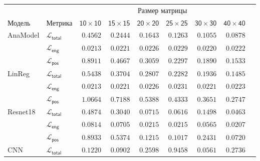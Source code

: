\documentclass[a4paper,12pt]{extarticle}
\begin{document}
\begin{table}[t]
	\footnotesize
	\centering
	\begin{tabular}{llrrrrrrr}
		\toprule
		{} & {} & \multicolumn{6}{c}{\textsf{Размер матрицы}} \\
		\cmidrule(lr){3-8}
		\textsf{Модель} & \textsf{Метрика} & $\mathsf{10 \times 10}$ &  $\mathsf{15 \times 15}$ &  $\mathsf{20 \times 20}$ &  $\mathsf{25 \times 25}$ &  $\mathsf{30 \times 30}$ &  $\mathsf{40 \times 40}$ \\
		\midrule
        \textsf{AnaModel} & $\mathcal{L}_{\mathsf{total}}$ & $\mathsf{0.4562}$ & $\mathsf{0.2444}$ & $\mathsf{0.1643}$ & $\mathsf{0.1263}$ & $\mathsf{0.1055}$ & $\mathsf{0.0878}$ \\
        {} & $\mathcal{L}_{\mathsf{eng}}$ & $\mathsf{0.0213}$ & $\mathsf{0.0221}$ & $\mathsf{0.0226}$ & $\mathsf{0.0229}$ & $\mathsf{0.0220}$ & $\mathsf{0.0222}$ \\
        {} & $\mathcal{L}_{\mathsf{pos}}$ & $\mathsf{0.8911}$ & $\mathsf{0.4667}$ & $\mathsf{0.3059}$ & $\mathsf{0.2297}$ & $\mathsf{0.1890}$ & $\mathsf{0.1533}$ \\
        \midrule
        \textsf{LinReg} & $\mathcal{L}_{\mathsf{total}}$ & $\mathsf{0.5438}$ & $\mathsf{0.3704}$ & $\mathsf{0.2807}$ & $\mathsf{0.2282}$ & $\mathsf{0.1936}$ & $\mathsf{0.1485}$ \\
        {} & $\mathcal{L}_{\mathsf{eng}}$ & $\mathsf{0.0213}$ & $\mathsf{0.0221}$ & $\mathsf{0.0226}$ & $\mathsf{0.0231}$ & $\mathsf{0.0221}$ & $\mathsf{0.0223}$ \\
        {} & $\mathcal{L}_{\mathsf{pos}}$ & $\mathsf{1.0664}$ & $\mathsf{0.7188}$ & $\mathsf{0.5388}$ & $\mathsf{0.4333}$ & $\mathsf{0.3651}$ & $\mathsf{0.2747}$ \\
        \midrule
        \textsf{Resnet18} & $\mathcal{L}_{\mathsf{total}}$ & $\mathsf{0.4874}$ & $\mathsf{0.3040}$ & $\mathsf{0.0715}$ & $\mathsf{0.0616}$ & $\mathsf{0.1498}$ & $\mathsf{0.0463}$ \\
        {} & $\mathcal{L}_{\mathsf{eng}}$ & $\mathsf{0.0814}$ & $\mathsf{0.0705}$ & $\mathsf{0.0215}$ & $\mathsf{0.0215}$ & $\mathsf{0.0565}$ & $\mathsf{0.0207}$ \\
        {} & $\mathcal{L}_{\mathsf{pos}}$ & $\mathsf{0.8933}$ & $\mathsf{0.5374}$ & $\mathsf{0.1215}$ & $\mathsf{0.1017}$ & $\mathsf{0.2431}$ & $\mathsf{0.0720}$ \\
        \midrule
        \textsf{CNN} & $\mathcal{L}_{\mathsf{total}}$ & $\mathsf{0.1220}$ & $\mathsf{0.0902}$ & $\mathsf{0.2598}$ & $\mathsf{0.9458}$ & $\mathsf{0.0561}$ & $\mathsf{0.2736}$ \\

\end{tabular}
\end{table}
\end{document}
